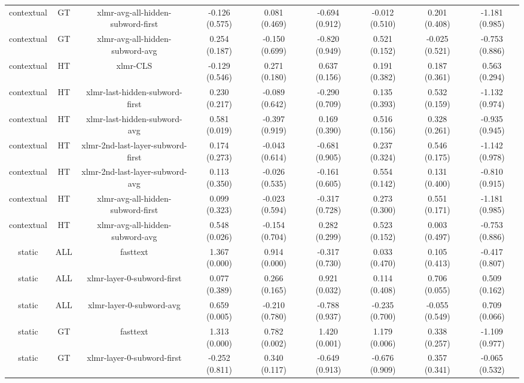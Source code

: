 \begin{sidewaystable}[htb]
\begin{tabular}{@{}ccccccccc@{}}
        contextual & GT & xlmr-avg-all-hidden-subword-first & -0.126 (0.575) & 0.081 (0.469) & -0.694 (0.912) & -0.012 (0.510) & 0.201 (0.408) & -1.181 (0.985) \\
        contextual & GT & xlmr-avg-all-hidden-subword-avg & 0.254 (0.187) & -0.150 (0.699) & -0.820 (0.949) & 0.521 (0.152) & -0.025 (0.521) & -0.753 (0.886) \\
        contextual & HT & xlmr-CLS & -0.129 (0.546) & 0.271 (0.180) & 0.637 (0.156) & 0.191 (0.382) & 0.187 (0.361) & 0.563 (0.294) \\
        contextual & HT & xlmr-last-hidden-subword-first & 0.230 (0.217) & -0.089 (0.642) & -0.290 (0.709) & 0.135 (0.393) & 0.532 (0.159) & -1.132 (0.974) \\
        contextual & HT & xlmr-last-hidden-subword-avg & 0.581 (0.019) & -0.397 (0.919) & 0.169 (0.390) & 0.516 (0.156) & 0.328 (0.261) & -0.935 (0.945) \\
        contextual & HT & xlmr-2nd-last-layer-subword-first & 0.174 (0.273) & -0.043 (0.614) & -0.681 (0.905) & 0.237 (0.324) & 0.546 (0.175) & -1.142 (0.978) \\
        contextual & HT & xlmr-2nd-last-layer-subword-avg & 0.113 (0.350) & -0.026 (0.535) & -0.161 (0.605) & 0.554 (0.142) & 0.131 (0.400) & -0.810 (0.915) \\
        contextual & HT & xlmr-avg-all-hidden-subword-first & 0.099 (0.323) & -0.023 (0.594) & -0.317 (0.728) & 0.273 (0.300) & 0.551 (0.171) & -1.181 (0.985) \\
        contextual & HT & xlmr-avg-all-hidden-subword-avg & 0.548 (0.026) & -0.154 (0.704) & 0.282 (0.299) & 0.523 (0.152) & 0.003 (0.497) & -0.753 (0.886) \\
        static & ALL & fasttext & 1.367 (0.000) & 0.914 (0.000) & -0.317 (0.730) & 0.033 (0.470) & 0.105 (0.413) & -0.417 (0.807) \\
        static & ALL & xlmr-layer-0-subword-first & 0.077 (0.389) & 0.266 (0.165) & 0.921 (0.032) & 0.114 (0.408) & 0.706 (0.055) & 0.509 (0.162) \\
        static & ALL & xlmr-layer-0-subword-avg & 0.659 (0.005) & -0.210 (0.780) & -0.788 (0.937) & -0.235 (0.700) & -0.055 (0.549) & 0.709 (0.066) \\
        static & GT & fasttext & 1.313 (0.000) & 0.782 (0.002) & 1.420 (0.001) & 1.179 (0.006) & 0.338 (0.257) & -1.109 (0.977) \\
        static & GT & xlmr-layer-0-subword-first & -0.252 (0.811) & 0.340 (0.117) & -0.649 (0.913) & -0.676 (0.909) & 0.357 (0.341) & -0.065 (0.532) \\

\end{tabular}
\end{sidewaystable}
